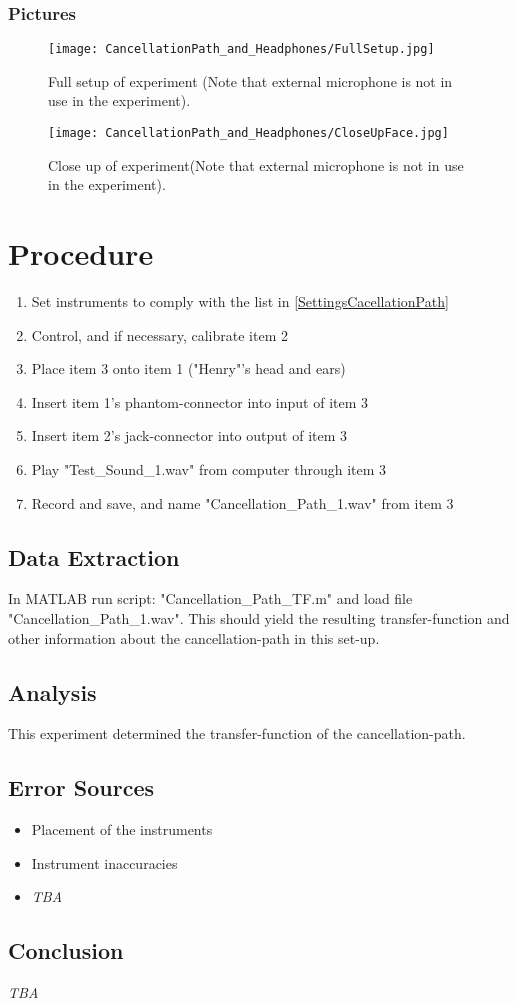 \subsubsection{Pictures}
\begin{figure}[H]
	\centering
	\texttt{[image: CancellationPath\_and\_Headphones/FullSetup.jpg]}
	\caption{Full setup of experiment (Note that external microphone is not in use in the experiment).}
	\label{FullSetupCancellationPath}
\end{figure}

\begin{figure}[H]
	\centering
	\texttt{[image: CancellationPath\_and\_Headphones/CloseUpFace.jpg]}
	\caption{Close up of experiment(Note that external microphone is not in use in the experiment).}
	\label{CloseUpCancellationPath}
\end{figure}

\section{Procedure}
\begin{enumerate}
	\item Set instruments to comply with the list in \ref{SettingsCacellationPath}
	\item Control, and if necessary, calibrate item 2
	\item Place item 3 onto item 1 ("Henry"'s head and ears)
	\item Insert item 1's phantom-connector into input of item 3
	\item Insert item 2's jack-connector into output of item 3
	\item Play "Test\_Sound\_1.wav" from computer through item 3
	\item Record and save, and name "Cancellation\_Path\_1.wav" from item 3
\end{enumerate}

\subsection{Data Extraction}
In MATLAB\textsuperscript{\textregistered} run script: "Cancellation\_Path\_TF.m" and load file "Cancellation\_Path\_1.wav". This should yield the resulting transfer-function and other information about the cancellation-path in this set-up.

\subsection{Analysis}
This experiment determined the transfer-function of the cancellation-path.

\subsection{Error Sources}
\begin{itemize}
	\item Placement of the instruments
	\item Instrument inaccuracies 
	\item \textit{TBA}
\end{itemize}

\subsection{Conclusion}
\textit{TBA}